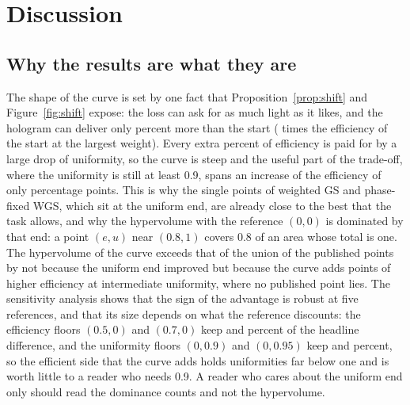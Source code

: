 \section{Discussion}\label{sec:discussion}

\subsection{Why the results are what they are}\label{sec:disc-why}

The shape of the curve is set by one fact that Proposition~\ref{prop:shift} and Figure~\ref{fig:shift} expose: the loss can ask for as much light as it likes, and the hologram can deliver only \eMaxRatioPct{} percent more than the start (\eMaxRatio{} times the efficiency of the start at the largest weight). Every extra percent of efficiency is paid for by a large drop of uniformity, so the curve is steep and the useful part of the trade-off, where the uniformity is still at least 0.9, spans an increase of the efficiency of
only \eGainUNinePp{} percentage points. This is why the single points of weighted GS and phase-fixed WGS, which sit at the uniform end, are already close to the best that the task allows, and why the hypervolume with the reference $(0,0)$ is dominated by that end: a point $(e,u)$ near $(0.8,1)$ covers $0.8$ of an area whose total is one. The hypervolume of the curve exceeds that of the union of the published points by \hvFiveDiff{} not because the uniform end improved but because the curve adds points of
higher efficiency at intermediate uniformity, where no published point lies. The sensitivity analysis shows that the sign of the advantage is robust at five references, and that its size depends on what the reference discounts: the efficiency floors $(0.5,0)$ and $(0.7,0)$ keep \hvRefFiveHalfShare{} and \hvRefFiveSevenShare{} percent of the headline difference, and the uniformity floors $(0,0.9)$ and $(0,0.95)$ keep \hvRefFiveUNineShare{} and \hvRefFiveUNineFiveShare{} percent, so the efficient side that the curve adds holds uniformities far below one and is worth little to a reader who needs 0.9. A reader who cares about the uniform end only should read the dominance counts and not the hypervolume.

